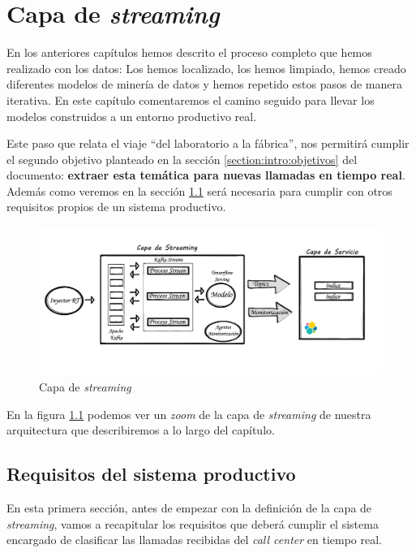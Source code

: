 \chapter{Capa de \textit{streaming}}
\label{chapter:prod}

En los anteriores capítulos hemos descrito el proceso completo que hemos realizado con los datos: Los hemos localizado, los hemos limpiado, hemos creado diferentes modelos de minería de datos y hemos repetido estos pasos de manera iterativa. En este capítulo comentaremos el camino seguido para llevar los modelos construidos a un entorno productivo real.

Este paso que relata el viaje ``del laboratorio a la fábrica'', nos permitirá  cumplir el segundo objetivo planteado en la sección \ref{section:intro:objetivos} del documento: \textbf{extraer esta temática para nuevas llamadas en tiempo real}. Además como veremos en la sección \ref{section:prod:req} será necesaria para cumplir con otros requisitos propios de un sistema productivo.

\begin{figure}[!ht]
	\centering
	\includegraphics[width=1\textwidth]{images/exp/streaminglayer_v1}
	\caption{Capa de \textit{streaming}}
	\label{fig:streamlayer}
\end{figure}


En la figura \ref{fig:streamlayer} podemos ver un \textit{zoom} de la capa de \textit{streaming} de nuestra arquitectura que describiremos a lo largo del capítulo. 



\section{Requisitos del sistema productivo}
\label{section:prod:req}

En esta primera sección, antes de empezar con la definición de la capa de \textit{streaming}, vamos a recapitular los requisitos que deberá cumplir el sistema encargado de clasificar las llamadas recibidas del \textit{call center} en tiempo real. 

